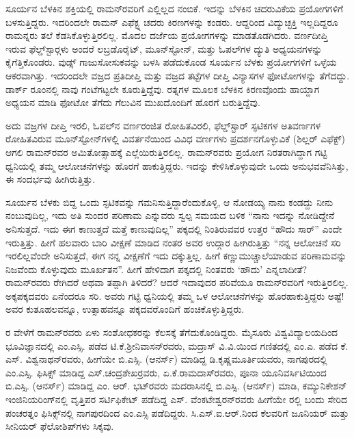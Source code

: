 ಸೂರ್ಯನ ಬೆಳಕಿನ ಶಕ್ತಿಯಲ್ಲಿ ರಾಮನ್‍ರವರಿಗೆ ಎಲ್ಲಿಲ್ಲದ ನಂಬಿಕೆ. ಇದನ್ನು ಬೆಳಕಿನ ಚದರುವಿಕೆಯ ಪ್ರಯೋಗಗಳಿಗೆ ಬಳಸುತ್ತಿದ್ದರು. ಇದರಿಂದಲೇ ರಾಮನ್ ಎಫೆಕ್ಟ್ನ ಚದರು ಕಿರಣಗಳನ್ನು ಕಂಡರು. ಆದ್ದರಿಂದ ವಿದ್ಯುಚ್ಛಕ್ತಿ ಇಲ್ಲದಿದ್ದರೂ ರಾಮನ್ನರು ತಲೆ ಕೆಡಸಿಕೊಳ್ಳುತ್ತಿರಲಿಲ್ಲ. ಮೊದಲ ದರ್ಜೆಯ ಪ್ರಯೋಗಗಳನ್ನು ಮಾಡತೊಡಗಿದರು. ವರ್ಣದೀಪ್ತಿ ಇರುವ ಫೆಲ್ಡ್‌ಸ್ಟಾರ್‍ಗಳು ಅಂದರೆ ಲಬ್ರಡೊರೈಟ್, ಮೂನ್‍ಸ್ಟೋನ್, ಮತ್ತು ಓಪಲ್‍ಗಳ ದ್ಯುತಿ ಅಧ್ಯಯನಗಳನ್ನು ಕೈಗೆತ್ತಿಕೊಂಡರು. ವುಡ್ಸ್ ಗಾಜುಸೋಸುಕವನ್ನು ಬಳಸಿ ಪಡೆದುಕೊಂಡ ಸೂರ್ಯನ ಬೆಳಕು ಪ್ರಯೋಗಗಳಿಗೆ ಒಳ್ಳೆಯ ಆಕರವಾಗಿತ್ತು. ಇದರಿಂದಲೇ ವಜ್ರದ ಪ್ರತಿದೀಪ್ತಿ ಮತ್ತು ವಜ್ರದ ತಟ್ಟೆಗಳ ದೀಪ್ತಿ ವಿನ್ಯಾಸಗಳ ಫೋಟೋಗಳನ್ನು ತೆಗೆದದ್ದು. ಡಾರ್ಕ್ ರೂಂನಲ್ಲಿ ನಾವು ಗಂಟೆಗಟ್ಟಲೇ ಕೂರುತ್ತಿದ್ದೆವು. ರತ್ನಗಳ ಮೂಲಕ ಬೆಳಕಿನ ಕಿರಣವೊಂದು ಹಾಯ್ದಾಗ ಅಧ್ಯಯನ ಮಾಡಿ ಫೋಟೋ ತೆಗೆದು ಗೆಲುವಿನ ಮುಖದೊಂದಿಗೆ ಹೊರಗೆ ಬರುತ್ತಿದ್ದೆವು.

ಅದು ವಜ್ರಗಳ ದೀಪ್ತಿ ಇರಲಿ, ಓಪಲ್‍ನ ವರ್ಣರಂಜಿತ ರೋಹಿತವಿರಲಿ, ಫೆಲ್ಡ್‌ಸ್ಟಾರ್ ಸ್ಫಟಿಕಗಳ ಅತಿವರ್ಣಗಳ ರೋಹಿತವಿರುವ ಮೂನ್‍ಸ್ಟೋನ್‍ಗಳಲ್ಲಿ ವಿವರ್ತನೆಯಿಂದ ವಿವಿಧ ವರ್ಣಗಳು ಪ್ರದರ್ಶನಗೊಳ್ಳುವಿಕೆ (ಶಿಲ್ಲರ್ ಎಫೆಕ್ಟ್) \enginline{-}ಆಗಲಿ ರಾಮನ್‍ರವರ ಅಮಿತೋತ್ಸಾಹಕ್ಕೆ ಎಲ್ಲೆಯಿರುತ್ತಿರಲಿಲ್ಲ. ರಾಮನ್‍ರವರು ಪ್ರಯೋಗ ನಿರತರಾಗಿದ್ದಾಗ ಗಟ್ಟಿ ಧ್ವನಿಯಲ್ಲಿ ತಮ್ಮ ಆಲೋಚನೆಗಳನ್ನು ಹೊರಗೆ ಹಾಕುತ್ತಿದ್ದರು. ಇದನ್ನು ಕೇಳಿಸಿಕೊಳ್ಳುವುದೇ ಒಂದು ಅನುಭವವೆನಿಸಿತ್ತು, ಈ ಸಂದರ್ಭವು ಹೀಗಿರುತ್ತಿತ್ತು.

ಸೂರ್ಯನ ಬೆಳಕು ಬಿದ್ದ ಒಂದು ಸ್ಫಟಿಕವನ್ನು ಗಮನಿಸುತ್ತಿದ್ದಾರೆಂದುಕೊಳ್ಳಿ, ಆ ನೋಡಯ್ಯ ನಾನು ಕಂಡದ್ದು ನೀನು ನಂಬುವುದಿಲ್ಲ, ಇದು ಅತಿ ಸುಂದರ ಪರಿಣಾಮ ಎನ್ನುವರು ಸ್ವಲ್ಪ ಸಮಯದ ಬಳಿಕ “ನಾನು ಇದನ್ನು ನೋಡಿದ್ದೇನೆ ಅನಿಸುತ್ತದೆ. ಇದು ಈಗ ಕಾಣುತ್ತದೆ ಮತ್ತೆ ಕಾಣುವುದಿಲ್ಲ” ಪಕ್ಕದಲ್ಲಿ ನಿಂತಿರುವವರ ಉತ್ತರ “ಹೌದು ಸಾರ್” ಎಂದೇ ಇರುತ್ತಿತ್ತು. ಹೀಗೆ ಹಲವಾರು ಬಾರಿ ವೀಕ್ಷಣೆ ಮಾಡಿದ ನಂತರ ಅವರ ಉದ್ಗಾರ ಹೀಗಿರುತ್ತಿತ್ತು \enginline{-} “ನನ್ನ ಆಲೋಚನೆ ಸರಿ ಇರಲಿಲ್ಲವೆಂದೇ ಅನಿಸುತ್ತದೆ, ಈಗ ನನ್ನ ವೀಕ್ಷಣೆಗೆ ಇದು ದಕ್ಕುತ್ತಿಲ್ಲ. ಹೀಗೆ ಕಣ್ಣುಮುಚ್ಚಾಲೆಯಾಡುವ ಪರಿಣಾಮವನ್ನು ನಿಜವೆಂದು ಕೊಳ್ಳುವುದು ಮೂರ್ಖತನ”. ಹೀಗೆ ಹೇಳಿದಾಗ ಪಕ್ಕದಲ್ಲಿ ನಿಂತವರು ‘ಹೌದು’ ಎನ್ನಲಾದೀತೆ? ರಾಮನ್‍ರವರು ರೇಗಿದರೆ ಅಥವಾ ತಪ್ಪಾಗಿ ತಿಳಿದರೆ? ಆದರೆ ಇದಾವುದರ ಪರಿವೆಯೂ ರಾಮನ್‍ರವರಿಗೆ ಇರುತ್ತಿರಲಿಲ್ಲ. ಅಕ್ಕಪಕ್ಕದವರು ಏನೆಂದರೂ ಸರಿ. ಅವರು ಗಟ್ಟಿ ಧ್ವನಿಯಲ್ಲಿ ತಮ್ಮ ಒಳ ಆಲೋಚನೆಗಳನ್ನು ಹೊರಹಾಕುತ್ತಿದ್ದರು ಅಷ್ಟೆ! ಅವರ ಕುತೂಹಲವನ್ನೂ, ಉತ್ಸಾಹವನ್ನೂ ಪಕ್ಕದವರೊಂದಿಗೆ ಹಂಚಿಕೊಳ್ಳುತ್ತಿದ್ದರು.

ರ ವೇಳೆಗೆ ರಾಮನ್‍ರವರು ಏಳು ಸಂಶೋಧಕರನ್ನು ಕೆಲಸಕ್ಕೆ ತೆಗೆದುಕೊಂಡಿದ್ದರು. ಮೈಸೂರು ವಿಶ್ವವಿದ್ಯಾಲಯದಿಂದ ಭೂವಿಜ್ಞಾನದಲ್ಲಿ ಎಂ.ಎಸ್ಸಿ. ಪಡೆದ ಟಿ.ಕೆ.ಶ‍್ರೀನಿವಾಸನ್‍ರವರು, ಮದ್ರಾಸ್ ವಿ.ವಿ.ಯಿಂದ ಗಣಿತದಲ್ಲಿ ಎಂ.ಎ. ಪಡೆದ ಕೆ. ಎಸ್. ವಿಶ್ವನಾಥನ್‍ರವರು, ಹೀಗೆಯೇ ಬಿ.ಎಸ್ಸಿ. (ಆನರ್ಸ್) ಮಾಡಿದ್ದ ಡಿ.ಕೃಷ್ಣಮೂರ್ತಿಯವರು, ನಾಗಪುರದಲ್ಲಿ ಎಂ.ಎಸ್ಸಿ. ಫಿಸಿಕ್ಸ್ ಮಾಡಿದ್ದ ಎಸ್.ಚಂದ್ರಶೇಖರ್‍ರವರು, ಏ.ಕೆ.ರಾಮದಾಸ್‍ರವರು, ಪೂನಾ ಯೂನಿವರ್ಸಿಟಿಯಿಂದ ಬಿ.ಎಸ್ಸಿ. (ಆನರ್ಸ್) ಮಾಡಿದ್ದ ಎಂ. ಆರ್. ಭಟ್‍ರವರು ಮದರಾಸಿನಲ್ಲಿ ಬಿ.ಎಸ್ಸಿ. (ಆನರ್ಸ್) ಮಾಡಿ, ಕಮ್ಯುನಿಕೇಶನ್ ಇಂಜಿನಿಯರಿಂಗ್‍ನಲ್ಲಿ ವೃತ್ತಿಪರ ಸರ್ಟಿಫಿಕೇಟ್ ಪಡೆದಿದ್ದ ಎಸ್. ವೆಂಕಟೇಶ್ವರನ್‍ರವರು ಹೀಗೆಯೇ ರಲ್ಲಿ ಬಂದು ಸೇರಿದ ಪಂಚರತ್ನಂ ಫಿಸಿಕ್ಸ್‌ನಲ್ಲಿ ನಾಗಪುರದಿಂದ ಎಂ.ಎಸ್ಸಿ ಪಡೆದಿದ್ದರು. ಸಿ.ಎಸ್.ಐ.ಆರ್.ನಿಂದ ಕೆಲವರಿಗೆ ಜೂನಿಯರ್ ಮತ್ತು ಸೀನಿಯರ್ ಫೆಲೋ\-ಶಿಪ್‍ಗಳು ಸಿಕ್ಕವು.

